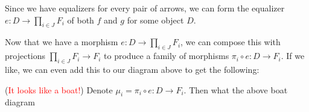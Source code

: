 \begin{prf}
\begin{center}
        \end{center}
        Since we have equalizers for every pair of arrows, we can form
        the equalizer $\displaystyle e:D \to \prod_{i \in J}F_i$ 
        of both $f$ and $g$ for some object $D$.
        \begin{center}
        \end{center}   
        Now that we have a morphism 
        $\displaystyle e: D \to \prod_{i \in J}F_i$,  
        we can compose this with projections $\displaystyle 
        \prod_{i \in J}F_i \to F_i$ to produce a family of
        morphisms $\pi_i \circ e: D \to F_i$. If we like, we can even 
        add this to our diagram above to get the following:
        \begin{center}
        \end{center}
        (\textcolor{Red}{It looks like a boat!}) Denote $\mu_i = \pi_i \circ e: D \to F_i$. Then what the above boat diagram 

\end{prf}
